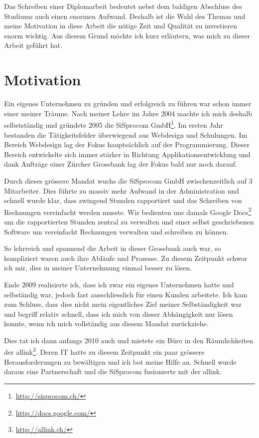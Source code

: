 Das Schreiben einer Diplomarbeit bedeutet nebst dem baldigen Abschluss des Studiums
auch einen enormen Aufwand. Deshalb ist die Wahl des Themas und meine
Motivation in diese Arbeit die nötige Zeit und Qualität zu investieren enorm
wichtig. Aus diesem Grund möchte ich kurz erläutern, was mich zu dieser
Arbeit geführt hat.

\section{Motivation}
Ein eigenes Unternehmen zu gründen und erfolgreich zu führen war schon immer
einer meiner Träume. Nach meiner Lehre im Jahre 2004 machte ich mich deshalb
selbstständig und gründete 2005 die SiSprocom GmbH\footnote{\url{http://sisprocom.ch/}}. 
Im ersten Jahr bestanden
die Tätigkeitsfelder überwiegend aus Webdesign und Schulungen. Im Bereich
Webdesign lag der Fokus hauptsächlich auf der Programmierung. Dieser Bereich 
entwickelte sich immer stärker in Richtung 
Applikationsentwicklung und dank Aufträge einer Zürcher Grossbank 
lag der Fokus bald nur noch darauf.

Durch dieses grössere Mandat wuchs die SiSprocom GmbH zwischenzeitlich
auf 3 Mitarbeiter. Dies führte zu massiv mehr Aufwand in der Administration
und schnell wurde klar, dass zwingend Stunden rapportiert und das Schreiben
von Rechnungen vereinfacht werden musste. Wir bedienten uns damals Google 
Docs\footnote{\url{http://docs.google.com/}} um die rapportierten Stunden zentral zu 
verwalten und einer selbst geschriebenen Software um vereinfacht Rechnungen 
verwalten und schreiben zu können.

So lehrreich und spannend die Arbeit in dieser Grossbank auch war, so kompliziert
waren auch ihre Abläufe und Prozesse. Zu diesem Zeitpunkt schwor ich mir, dies
in meiner Unternehmung einmal besser zu lösen.

Ende 2009 realisierte ich, dass ich zwar ein eigenes Unternehmen hatte und
selbständig war, jedoch fast ausschliesslich für einen Kunden arbeitete.
Ich kam zum Schluss, dass dies nicht mein eigentliches Ziel meiner Selbständigkeit 
war und begriff
relativ schnell, dass ich mich von dieser Abhängigkeit nur lösen konnte, wenn
ich mich vollständig aus diesem Mandat zurückziehe.

Dies tat ich dann anfangs 2010 auch und mietete ein Büro in den Räumlichkeiten
der allink\footnote{\url{http://allink.ch/}}. Deren IT hatte zu diesem Zeitpunkt 
ein paar grössere
Herausforderungen zu bewältigen und ich bot meine Hilfe an. Schnell wurde
daraus eine Partnerschaft und die SiSprocom fusionierte mit der allink.

